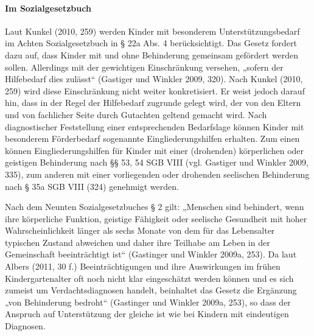 \paragraph{Im Sozialgesetzbuch}
Laut Kunkel (2010, 259) werden Kinder mit besonderem Unterstützungsbedarf im Achten Sozialgesetzbuch in § 22a Abs. 4 berücksichtigt. Das Gesetz fordert dazu auf, dass Kinder mit und ohne Behinderung gemeinsam gefördert werden sollen. Allerdings mit der gewichtigen Einschränkung versehen, „sofern der Hilfebedarf dies zulässt“ (Gastiger und Winkler 2009, 320). Nach Kunkel (2010, 259) wird diese Einschränkung nicht weiter konkretisiert. Er weist jedoch darauf hin, dass in der Regel der Hilfebedarf zugrunde gelegt wird, der von den Eltern und von fachlicher Seite durch Gutachten geltend gemacht wird. Nach diagnostischer Feststellung einer entsprechenden Bedarfslage können Kinder mit besonderem Förderbedarf sogenannte Eingliederungshilfen erhalten. Zum einen können Eingliederungshilfen für Kinder mit einer (drohenden) körperlichen oder geistigen Behinderung nach §§ 53, 54 SGB VIII (vgl. Gastiger und Winkler 2009, 335), zum anderen mit einer vorliegenden oder drohenden seelischen Behinderung nach § 35a SGB VIII (324) genehmigt werden.
 
Nach dem Neunten Sozialgesetzbuches § 2 gilt: „Menschen sind behindert, wenn ihre körperliche Funktion, geistige Fähigkeit oder seelische Gesundheit mit hoher Wahrscheinlichkeit länger als sechs Monate von dem für das Lebensalter typischen Zustand abweichen und daher ihre Teilhabe am Leben in der Gemeinschaft beeinträchtigt ist“ (Gastinger und Winkler 2009a, 253). Da laut Albers (2011, 30 f.) Beeinträchtigungen und ihre Auswirkungen im frühen Kindergartenalter oft noch nicht klar eingeschätzt werden können und es sich zumeist um Verdachtsdiagnosen handelt, beinhaltet das Gesetz die Ergänzung „von Behinderung bedroht“ (Gastinger und Winkler 2009a, 253), so dass der Anspruch auf Unterstützung der gleiche ist wie bei Kindern mit eindeutigen Diagnosen.

